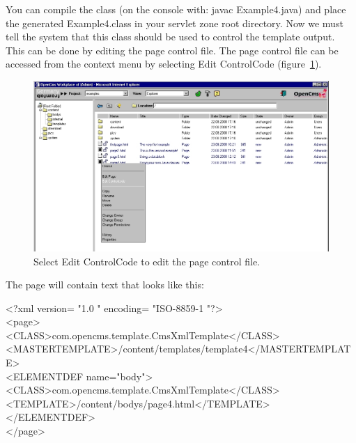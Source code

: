 You can compile the class (on the console with: {\class javac Example4.java)}
and place the generated {\class Example4.class} in your servlet zone root
directory. Now we must tell the system that this class should be used
to control the template output. This can be done by editing the page
{\name control file}. The page {\name control file} can be accessed from the context
menu by selecting {\name Edit ControlCode} (figure~\ref{EditControlCode1}).

\begin{figure}
\begin{center}
\includegraphics[clip,width=\sgw]{pics/modules/29}
\end{center}
\caption[EditControlCode1]{Select Edit ControlCode to edit the page control file.}
\label{EditControlCode1}
\end{figure}

The page will contain text that looks like this:

\begin{xml}
<?xml version= "1.0 " encoding= "ISO-8859-1 "?>\\
<page>\\
\xtaba <CLASS>com.opencms.template.CmsXmlTemplate</CLASS>\\
\xtaba <MASTERTEMPLATE>/content/templates/template4</MASTERTEMPLATE>\\
\xtaba <ELEMENTDEF name="body">\\
\xtaba <CLASS>com.opencms.template.CmsXmlTemplate</CLASS>\\
\xtaba <TEMPLATE>/content/bodys/page4.html</TEMPLATE>\\
\xtaba </ELEMENTDEF>\\
</page>\\
\end{xml}

